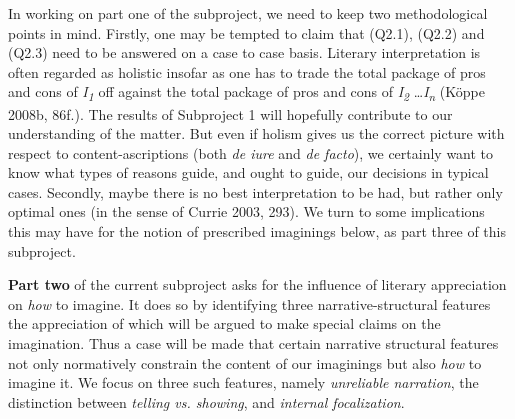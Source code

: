 \noindent In working on part one of the subproject, we need to keep two methodological points in mind. Firstly, one may be tempted to claim that (Q2.1), (Q2.2) and (Q2.3) need to be answered on a case to case basis. Literary interpretation is often regarded as holistic insofar as one has to trade the total package of pros and cons of \emph{I\textsubscript{1}} off against the total package of pros and cons of \emph{I\textsubscript{2}} \ldots \emph{I\textsubscript{n}} (K\"oppe 2008b, 86f.). The results of Subproject 1 will hopefully contribute to our understanding of the matter. But even if holism gives us the correct picture with respect to content-ascriptions (both \emph{de iure} and \emph{de facto}), we certainly want to know what types of reasons guide, and ought to guide, our decisions in typical cases. Secondly, maybe there is no best interpretation to be had, but rather only optimal ones (in the sense of Currie 2003, 293). We turn to some implications this may have for the notion of prescribed imaginings below, as part three of this subproject.

\textbf{Part two} of the current subproject asks for the influence of literary appreciation on \emph{how} to imagine. It does so by identifying three narrative-structural features the appreciation of which will be argued to make special claims on the imagination. Thus a case will be made that certain narrative structural features not only normatively constrain the content of our imaginings but also \emph{how} to imagine it. We focus on three such features, namely \emph{unreliable narration}, the distinction between \emph{telling vs. showing}, and \emph{internal focalization}.

